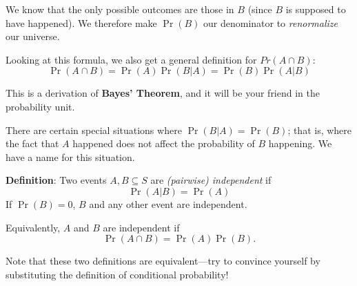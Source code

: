 \documentclass[12pt,letterpaper]{article}
\begin{document}
We know that the only possible outcomes are those in $B$ (since $B$ is supposed to have happened). We therefore make $\Pr(B)$ our denominator to \textit{renormalize} our universe. 

Looking at this formula, we also get a general definition for $Pr(A \cap B)$:
$$\Pr(A \cap B) = \Pr(A)\Pr(B | A) = \Pr(B)\Pr(A | B)$$

This is a derivation of \textbf{Bayes' Theorem}, and it will be your friend in the probability unit.

There are certain special situations where $\Pr(B | A) = \Pr(B)$; that is, where the fact that $A$ happened does not affect the probability of $B$ happening. We have a name for this situation.

\textbf{Definition}: Two events $A,B \subseteq S$ are \textit{(pairwise) independent} if $$\Pr(A|B)=\Pr(A)$$
If $\Pr(B)=0$, $B$ and any other event are independent.

Equivalently, $A$ and $B$ are independent if
\[
\Pr(A \cap B) = \Pr(A)\Pr(B).
\]

Note that these two definitions are equivalent---try to convince yourself by substituting the definition of conditional probability!
\end{document}
